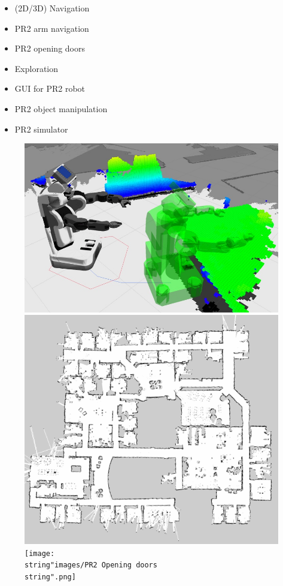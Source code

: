 \begin{minipage}[t]{0.45\textwidth}%
\begin{itemize}
\item (2D/3D) Navigation 
\item PR2 arm navigation
\item PR2 opening doors 
\item Exploration
\item GUI for PR2 robot
\item PR2 object manipulation 
\item PR2 simulator\end{itemize}
%
\end{minipage}%
\begin{minipage}[t]{0.5\paperwidth}%
\begin{figure}[H]
\noindent \centering{}\includegraphics[height=0.4\textheight]{images/PR2_3DNavigation}\\
\includegraphics[height=0.2\textheight]{images/2DMapping}\texttt{[image: \\string"images/PR2 Opening doors\\string".png]}
\end{figure}
%
\end{minipage}



